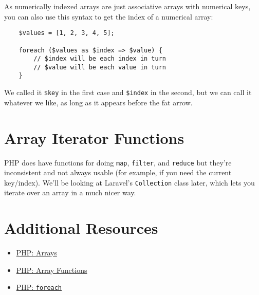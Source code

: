 As numerically indexed arrays are just associative arrays with numerical keys, you can also use this syntax to get the index of a numerical array:

\begin{verbatim}
    $values = [1, 2, 3, 4, 5];

    foreach ($values as $index => $value) {
        // $index will be each index in turn
        // $value will be each value in turn
    }
\end{verbatim}

We called it \texttt{\$key} in the first case and \texttt{\$index} in the second, but we can call it whatever we like, as long as it appears before the fat arrow.


\section{Array Iterator Functions}

PHP does have functions for doing \texttt{map}, \texttt{filter}, and \texttt{reduce} but they're inconsistent and not always usable (for example, if you need the current key/index). We'll be looking at Laravel's \texttt{Collection} class later, which lets you iterate over an array in a much nicer way.




\section{Additional Resources}

\begin{itemize}[leftmargin=*]
    \item \href{http://www.php.net/manual/en/language.types.array.php}{PHP: Arrays}
    \item \href{https://www.php.net/manual/en/ref.array.php}{PHP: Array Functions}
    \item \href{http://www.php.net/manual/en/control-structures.foreach.php}{PHP: \texttt{foreach}}
\end{itemize}

